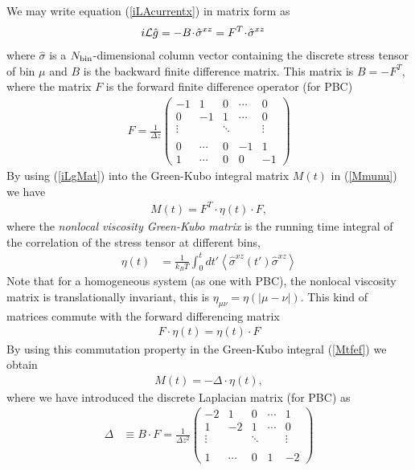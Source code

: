 \documentclass[b5paper,openright,10pt]{book}
\newcommand{\esc}{\!\cdot\!}
\newcommand{\llangle}{\left\langle}
\newcommand{\rrangle}{\right\rangle}
\begin{document}
We may write equation (\ref{iLAcurrentx}) in matrix form as
\begin{align}
  i{\cal L}\hat{g}&= -B\esc\hat{\sigma}^{xz} =F^T\esc\hat{\sigma}^{xz}
\label{iLgMat}
\end{align}
where  $\hat{\sigma}$ is  a  $N_{\rm  bin}$-dimensional column  vector
containing the  discrete stress tensor  of bin  $\mu$ and $B$  is the
backward finite difference matrix.  This matrix is $B=-F^T$, where the
matrix $ F$ is the forward finite difference operator (for PBC)
\begin{align}
 {F}=\frac{1}{\Delta z}\left(
    \begin{array}{rrrrr}
-1&1&0&\cdots&0\\
0&-1&1&\cdots&0\\
\vdots      &&\ddots&&\vdots\\
\\
0&\cdots&0&-1&1 
\\
1&\cdots&0&0&-1 \end{array}
\right)
\label{Dforward}
\end{align}
By using (\ref{iLgMat}) into the Green-Kubo integral matrix $M(t)$ in (\ref{Mmunu})
we have
\begin{align}
  M(t)=F^T\esc\eta(t)\esc F,
\label{Mtfef}
\end{align}
where  the  \textit{nonlocal  viscosity  Green-Kubo  matrix}  is  the
running  time integral  of the  correlation  of the  stress tensor  at
different bins,
\begin{align}
  \eta(t) &=\frac{1}{k_BT}\int_0^{t}dt' 
  \llangle \hat{\sigma}^{xz}(t')\hat{\sigma}^{xz}\rrangle
\label{non-loc}
\end{align}
Note that  for a homogeneous system  (as one with PBC),  the nonlocal
viscosity    matrix   is    translationally    invariant,   this    is
$\eta_{\mu\nu}=\eta(|\mu-\nu|)$.  This kind  of matrices  commute with
the forward differencing matrix
\begin{align}
  F\esc\eta(t)=\eta(t)\esc F
\label{commute}
\end{align}
By using this commutation property 
 in the Green-Kubo
integral (\ref{Mtfef}) we obtain
\begin{align}
  M(t)=-\Delta\esc \eta(t),
\label{MmunuMat}
\end{align}
where we have introduced  the discrete Laplacian matrix (for PBC) as
\begin{align}
\Delta&\equiv  B\esc F
=\frac{1}{\Delta z^2}\left(
    \begin{array}{rrrrr}
-2&1&0&\cdots&1\\
1&-2&1&\cdots&0\\
\vdots      &&\ddots&&\vdots\\
\\
1&\cdots&0&1&-2    \end{array}
\right)
\end{align}
\end{document}
